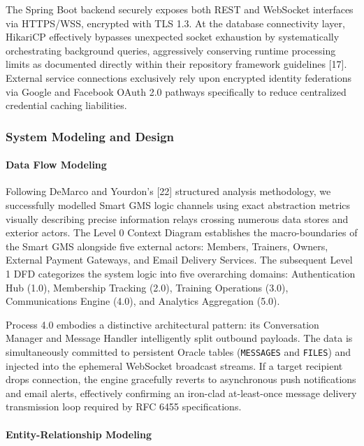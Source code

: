 The Spring Boot backend securely exposes both REST and WebSocket
interfaces via HTTPS/WSS, encrypted with TLS 1.3. At the database
connectivity layer, HikariCP effectively bypasses unexpected socket
exhaustion by systematically orchestrating background queries,
aggressively conserving runtime processing limits as documented directly
within their repository framework guidelines {[}17{]}. External service
connections exclusively rely upon encrypted identity federations via
Google and Facebook OAuth 2.0 pathways specifically to reduce
centralized credential caching liabilities.

\subsubsection*{System Modeling and Design}\label{system-modeling-and-design}

\paragraph*{Data Flow Modeling}\label{data-flow-modeling}

Following DeMarco and Yourdon's {[}22{]} structured analysis
methodology, we successfully modelled Smart GMS logic channels using
exact abstraction metrics visually describing precise information relays
crossing numerous data stores and exterior actors. The Level 0 Context
Diagram establishes the macro-boundaries of the Smart GMS alongside five
external actors: Members, Trainers, Owners, External Payment Gateways,
and Email Delivery Services. The subsequent Level 1 DFD categorizes the
system logic into five overarching domains: Authentication Hub (1.0),
Membership Tracking (2.0), Training Operations (3.0), Communications
Engine (4.0), and Analytics Aggregation (5.0).

Process 4.0 embodies a distinctive architectural pattern: its
Conversation Manager and Message Handler intelligently split outbound
payloads. The data is simultaneously committed to persistent Oracle
tables (\texttt{MESSAGES} and \texttt{FILES}) and injected into the
ephemeral WebSocket broadcast streams. If a target recipient drops
connection, the engine gracefully reverts to asynchronous push
notifications and email alerts, effectively confirming an iron-clad
at-least-once message delivery transmission loop required by RFC 6455
specifications.

\paragraph*{Entity-Relationship
Modeling}\label{entity-relationship-modeling}

